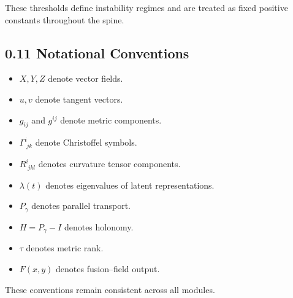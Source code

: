 These thresholds define instability regimes and are treated as fixed
positive constants throughout the spine.

\subsection*{0.11 Notational Conventions}

\begin{itemize}
\item $X,Y,Z$ denote vector fields.
\item $u,v$ denote tangent vectors.
\item $g_{ij}$ and $g^{ij}$ denote metric components.
\item $\Gamma^i_{\;jk}$ denote Christoffel symbols.
\item $R^i_{\;jkl}$ denotes curvature tensor components.
\item $\lambda(t)$ denotes eigenvalues of latent representations.
\item $P_\gamma$ denotes parallel transport.
\item $H = P_\gamma - I$ denotes holonomy.
\item $\tau$ denotes metric rank.
\item $F(x,y)$ denotes fusion–field output.
\end{itemize}

These conventions remain consistent across all modules.

